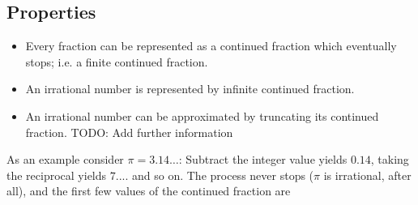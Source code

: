 \subsection{Properties}

\begin{itemize}

	\item Every fraction can be represented as a continued fraction which eventually stops; i.e. a finite continued fraction.

	\item An irrational number is represented by infinite continued fraction.

	\item An irrational number can be approximated by truncating its continued fraction. TODO: Add further information

\end{itemize}


As an example consider $\pi = 3.14 \ldots$: Subtract the integer value yields $0.14$, taking the reciprocal yields $7....$ and so on. The process never stops ($\pi$ is irrational, after all), and the first few values of the continued fraction are

\bee
\pi \approx [3;7,15,1,292,\ldots]
\eee




